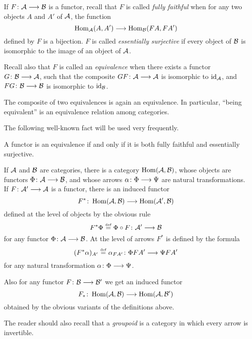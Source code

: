 \begin{1   PRELIMINARY NOTIONS}
\begin{1.2 Category theory}
If $F \colon \cA \arr \cB$ is a functor, recall that $F$ is called \emph{fully faithful} when for any two objects $A$ and $A'$ of $\mathcal{A}$, the function
   \[
   \hom_{\cA}(A, A') \arr \hom_{\cB}(FA, FA')
   \]
defined by $F$ is a bijection. $F$ is called \emph{essentially surjective} if every object of $\mathcal{B}$ is isomorphic to the image of an object of $\mathcal{A}$.

Recall also that $F$ is called an \emph{equivalence} when there exists a functor $G \colon \cB \arr \cA$, such that the composite $GF \colon \cA \arr \cA$ is isomorphic to $\mathrm{id}_{\mathcal{A}}$, and $FG \colon \cB \arr \cB$ is isomorphic to $\mathrm{id}_{\mathcal{B}}$.

The composite of two equivalences is again an equivalence. In particular, ``being equivalent'' is an equivalence relation among categories.

The following well-known fact will be used very frequently.

\begin{proposition}
A functor is an equivalence if and only if it is both fully faithful and essentially surjective.
\end{proposition}

If $\mathcal{A}$ and $\mathcal{B}$ are categories, there is a category $\operatorname{Hom}(\mathcal{A}, \mathcal{B})$, whose objects are functors $\Phi \colon \cA \arr \cB$, and whose arrows $\alpha \colon \Phi \arr \Psi$ are natural transformations. If $F \colon \cA' \arr \cA$ is a functor, there is an induced functor
   \[
   F^{*}\colon \hom(\cA, \cB) \arr \hom(\cA', \cB)
   \]
defined at the level of objects by the obvious rule
   \[
   F^{*}\Phi \eqdef \Phi \circ F \colon \cA' \arr \cB
   \]
for any functor $\Phi\colon \cA \arr \cB$. At the level of arrows $F^{*}$ is defined by the formula
   \[
   (F^{*}\alpha)_{A'} \eqdef \alpha_{FA'} \colon \Phi FA' \arr \Psi FA'
   \]
for any natural transformation $\alpha \colon \Phi \arr \Psi$.

Also for any functor $F \colon \cB \arr \cB'$ we get an induced functor
   \[
   F_{*}\colon \hom(\cA, \cB) \arr \hom(\cA, \cB')
   \]
obtained by the obvious variants of the definitions above.

The  reader should also recall that a \emph{groupoid} is a category in which every arrow is invertible.


\end{1.2 Category theory}
\end{1   PRELIMINARY NOTIONS}
